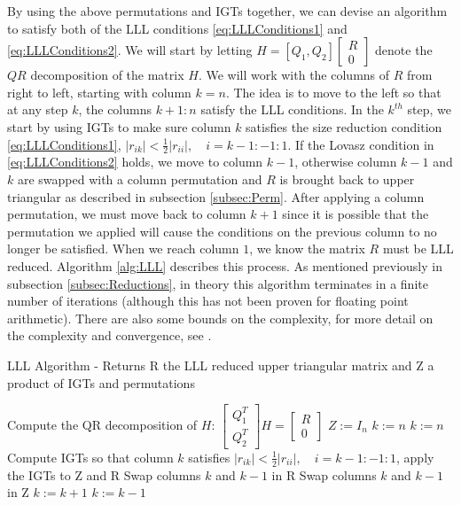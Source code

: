 \documentclass[12pt,Bold,letterpaper]{mcgilletdclass}
\newcommand{\bmx}{\begin{bmatrix}}
\newcommand{\emx}{\end{bmatrix}}
\newcommand{\bsmx}{\left[\begin{smallmatrix}}
\newcommand{\esmx}{\end{smallmatrix}\right]}
\begin{document}
By using the above permutations and IGTs together, we can devise an algorithm to
satisfy both of the LLL conditions \eqref{eq:LLLConditions1} and
\eqref{eq:LLLConditions2}. We will start by letting $H=[Q_1, Q_2] \bmx R \\ 0
\emx$ denote the $QR$ decomposition of the matrix $H$. We will work with the
columns of $R$ from right to left, starting with column $k=n$. The idea is to
move to the left so that at any step $k$, the columns $k+1:n$ satisfy the LLL
conditions. In the $k^{th}$ step, we start by using IGTs to make sure column $k$
satisfies the size reduction condition \eqref{eq:LLLConditions1}, $|r_{ik}| <
\frac{1}{2}|r_{ii}|, \quad i = k-1:-1:1$. If the Lovasz condition in
\eqref{eq:LLLConditions2} holds, we move to column $k-1$, otherwise column $k-1$
and $k$ are swapped with a column permutation and $R$ is brought back to upper
triangular as described in subsection \ref{subsec:Perm}. After applying a column
permutation, we must move back to column $k+1$ since it is possible that the
permutation we applied will cause the conditions on the previous column to no
longer be satisfied. When we reach column $1$, we know the matrix $R$ must be
LLL reduced. Algorithm \ref{alg:LLL} describes this process. As mentioned
previously in subsection \ref{subsec:Reductions}, in theory this algorithm terminates in a
finite number of iterations (although this has not been proven for floating
point arithmetic). There are also some bounds on the complexity, for more
detail on the complexity and convergence, see \cite{WubSJM11}.

\begin{algorithm}
\caption{LLL Algorithm - Returns R the LLL reduced upper triangular matrix and Z a product of IGTs and permutations}
\label{alg:LLL}
\begin{algorithmic}[1]
\STATE Compute the QR decomposition of $H$: $\bsmx Q_1^T \\ Q_2^T \esmx H= \bsmx R\\ 0 \esmx$
\STATE $Z := I_n$
\STATE $k := n$
		\STATE $k := n$	
	\ENDIF
	\STATE Compute IGTs so that column $k$ satisfies $|r_{ik}| < \frac{1}{2}|r_{ii}|, \quad i = k-1:-1:1$, apply the IGTs 		to Z and R
		\STATE Swap columns $k$ and $k-1$ in R
		\STATE Swap columns $k$ and $k-1$ in Z
		\STATE $k := k+1$
	\ELSE
		\STATE $k := k-1$
	\ENDIF
\ENDWHILE
\end{algorithmic}
\end{algorithm}
\end{document}
